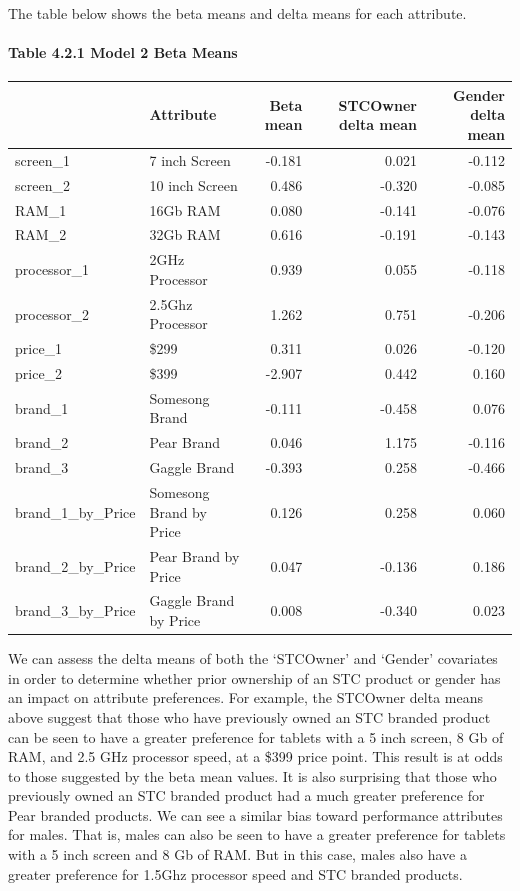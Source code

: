 \documentclass[]{article}
\let\oldparagraph\paragraph
\renewcommand{\paragraph}[1]{\oldparagraph{#1}\mbox{}}
\begin{document}
The table below shows the beta means and delta means for each attribute.

\paragraph{Table 4.2.1 Model 2 Beta
Means}\label{table-4.2.1-model-2-beta-means}

\begin{longtable}[]{@{}llrrr@{}}
\toprule
& Attribute & Beta mean & STCOwner delta mean & Gender delta
mean\tabularnewline
\midrule
\endhead
screen\_1 & 7 inch Screen & -0.181 & 0.021 & -0.112\tabularnewline
screen\_2 & 10 inch Screen & 0.486 & -0.320 & -0.085\tabularnewline
RAM\_1 & 16Gb RAM & 0.080 & -0.141 & -0.076\tabularnewline
RAM\_2 & 32Gb RAM & 0.616 & -0.191 & -0.143\tabularnewline
processor\_1 & 2GHz Processor & 0.939 & 0.055 & -0.118\tabularnewline
processor\_2 & 2.5Ghz Processor & 1.262 & 0.751 & -0.206\tabularnewline
price\_1 & \$299 & 0.311 & 0.026 & -0.120\tabularnewline
price\_2 & \$399 & -2.907 & 0.442 & 0.160\tabularnewline
brand\_1 & Somesong Brand & -0.111 & -0.458 & 0.076\tabularnewline
brand\_2 & Pear Brand & 0.046 & 1.175 & -0.116\tabularnewline
brand\_3 & Gaggle Brand & -0.393 & 0.258 & -0.466\tabularnewline
brand\_1\_by\_Price & Somesong Brand by Price & 0.126 & 0.258 &
0.060\tabularnewline
brand\_2\_by\_Price & Pear Brand by Price & 0.047 & -0.136 &
0.186\tabularnewline
brand\_3\_by\_Price & Gaggle Brand by Price & 0.008 & -0.340 &
0.023\tabularnewline
\bottomrule
\end{longtable}

We can assess the delta means of both the `STCOwner' and `Gender'
covariates in order to determine whether prior ownership of an STC
product or gender has an impact on attribute preferences. For example,
the STCOwner delta means above suggest that those who have previously
owned an STC branded product can be seen to have a greater preference
for tablets with a 5 inch screen, 8 Gb of RAM, and 2.5 GHz processor
speed, at a \$399 price point. This result is at odds to those suggested
by the beta mean values. It is also surprising that those who previously
owned an STC branded product had a much greater preference for Pear
branded products. We can see a similar bias toward performance
attributes for males. That is, males can also be seen to have a greater
preference for tablets with a 5 inch screen and 8 Gb of RAM. But in this
case, males also have a greater preference for 1.5Ghz processor speed
and STC branded products.
\end{document}
